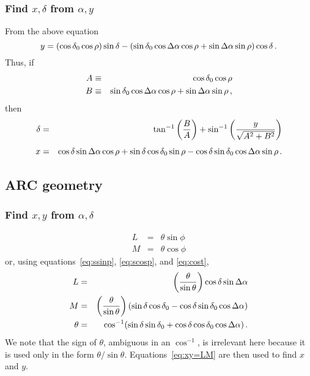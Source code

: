 \subsubsection{Find $x,\delta$ from $\alpha,y$}

From the above equation
\begin{displaymath}
  y = (\cos\delta_0\cos\rho)\sin\delta - (\sin\delta_0\cos\Delta\alpha\cos\rho
      + \sin\Delta\alpha\sin\rho)\cos\delta \, .
\end{displaymath}
Thus, if
\begin{eqnarray*}
  A & \equiv &\cos\delta_0\cos\rho \\
  B & \equiv &\sin\delta_0\cos\Delta\alpha\cos\rho +
       \sin\Delta\alpha\sin\rho \, ,
\end{eqnarray*}
then
\begin{eqnarray*}
  \delta & = &\tan^{-1}\left(\frac{B}{A}\right) + \sin^{-1}\left(
              \frac{y}{\sqrt{A^2+B^2}} \right) \\
 \noalign{\vskip 4pt}
  x & = & \cos\delta\sin\da\cos\rho + \sin\delta\cos\delta_0
       \sin\rho-\cos\delta\sin\delta_0\cos\da\sin\rho \, .
\end{eqnarray*}

\subsection{ARC geometry}
\subsubsection{Find $x,y$ from $\alpha,\delta$}

\begin{eqnarray}
  L & = &\theta\sin\phi \nonumber \\
  M & = &\theta\cos\phi \label{eq:LMarc}
\end{eqnarray}
or, using equations~\ref{eq:ssinp}, \ref{eq:scosp}, and \ref{eq:cost},
\begin{eqnarray}
  L & = &\left( \frac{\theta}{\sin\theta}\right)
          \cos\delta\sin\Delta\alpha \nonumber \\
  M & = &\left( \frac{\theta}{\sin\theta}\right) (\sin\delta
          \cos\delta_0 - \cos\delta\sin\delta_0\cos\Delta\alpha)
          \label{eq:LMtarc}\\
  \theta & = &\cos^{-1} (\sin\delta\sin\delta_0 +
          \cos\delta\cos\delta_0\cos\Delta\alpha) \, . \nonumber
\end{eqnarray}
We note that the sign of $\theta$, ambiguous in an $\cos^{-1}$, is
irrelevant here because it is used only in the form
$\theta/\sin\theta$. Equations~\ref{eq:xy=LM} are then used to find
$x$ and $y$.

